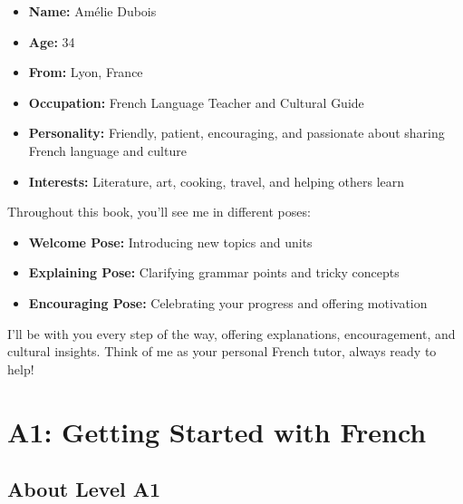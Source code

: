 \begin{mascotbox}
\begin{itemize}
\item \textbf{Name:} Amélie Dubois
\item \textbf{Age:} 34
\item \textbf{From:} Lyon, France
\item \textbf{Occupation:} French Language Teacher and Cultural Guide
\item \textbf{Personality:} Friendly, patient, encouraging, and passionate about sharing French language and culture
\item \textbf{Interests:} Literature, art, cooking, travel, and helping others learn
\end{itemize}
\end{mascotbox}

Throughout this book, you'll see me in different poses:

\begin{itemize}
\item \textbf{Welcome Pose:} Introducing new topics and units
\item \textbf{Explaining Pose:} Clarifying grammar points and tricky concepts
\item \textbf{Encouraging Pose:} Celebrating your progress and offering motivation
\end{itemize}

I'll be with you every step of the way, offering explanations, encouragement, and cultural insights. Think of me as your personal French tutor, always ready to help!

\clearpage



\setcounter{page}{1}

\chapter{A1: Getting Started with French}
\label{chap:a1}

\section*{About Level A1}

